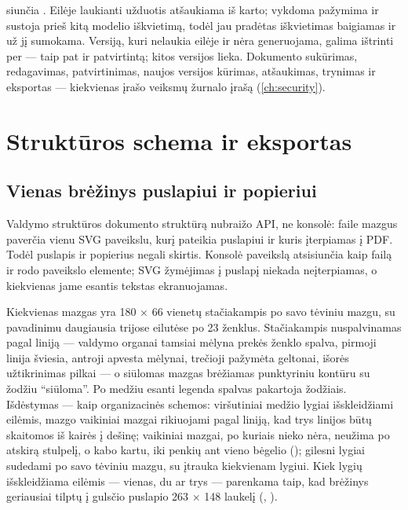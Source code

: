  siunčia . Eilėje laukianti
užduotis atšaukiama iš karto; vykdoma pažymima ir sustoja prieš kitą modelio iškvietimą, todėl
jau pradėtas iškvietimas baigiamas ir už jį sumokama. Versiją, kuri nelaukia eilėje ir nėra
generuojama, galima ištrinti per  --- taip pat ir patvirtintą;
kitos versijos lieka. Dokumento sukūrimas, redagavimas, patvirtinimas, naujos versijos kūrimas,
atšaukimas, trynimas ir eksportas --- kiekvienas įrašo veiksmų žurnalo įrašą
(\cref{ch:security}).


\section{Struktūros schema ir eksportas}\label{sec:programme:outputs}

\subsection{Vienas brėžinys puslapiui ir popieriui}

Valdymo struktūros dokumento struktūrą nubraižo API, ne konsolė:  faile
 mazgus paverčia vienu SVG paveikslu, kurį
 pateikia puslapiui ir kuris įterpiamas į PDF. Todėl
puslapis ir popierius negali skirtis. Konsolė paveikslą atsisiunčia kaip failą ir rodo
paveikslo elemente; SVG žymėjimas į puslapį niekada neįterpiamas, o kiekvienas jame esantis
tekstas ekranuojamas.

Kiekvienas mazgas yra 180 × 66 vienetų stačiakampis po savo tėviniu mazgu, su pavadinimu
daugiausia trijose eilutėse po 23 ženklus. Stačiakampis nuspalvinamas pagal liniją ---
valdymo organai tamsiai mėlyna prekės ženklo spalva, pirmoji linija šviesia, antroji apvesta
mėlynai, trečioji pažymėta geltonai, išorės užtikrinimas pilkai --- o siūlomas mazgas
brėžiamas punktyriniu kontūru su žodžiu \enquote{siūloma}. Po medžiu esanti legenda spalvas
pakartoja žodžiais. Išdėstymas --- kaip organizacinės schemos: viršutiniai medžio lygiai
išskleidžiami eilėmis, mazgo vaikiniai mazgai rikiuojami pagal liniją, kad trys linijos būtų skaitomos
iš kairės į dešinę; vaikiniai mazgai, po kuriais nieko nėra, neužima po atskirą stulpelį, o kabo kartu,
iki penkių ant vieno bėgelio (); gilesni lygiai sudedami po savo tėviniu mazgu, su
įtrauka kiekvienam lygiui. Kiek lygių išskleidžiama eilėmis --- vienas, du ar trys ---
parenkama taip, kad brėžinys geriausiai tilptų į gulsčio puslapio 263 × 148 laukelį
(, ).

